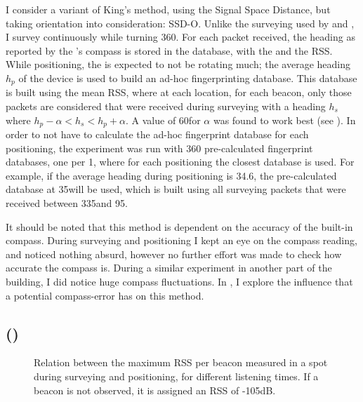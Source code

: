 I consider a variant of King's method, using the Signal Space Distance, but taking orientation into consideration: SSD-O.
Unlike the \wifi surveying used by \citet{bahl2000radar} and \citet{king2006compass}, I survey continuously while turning 360\tdegree.
For each packet received, the heading as reported by the \device's compass is stored in the database, with the \bid and the RSS.
While positioning, the \device is expected to not be rotating much; the average heading $h_p$ of the device is used to build an ad-hoc fingerprinting database.
This database is built using the mean RSS, where at each location, for each beacon, only those packets are considered that were received during surveying with a heading $h_s$ where $h_p - \alpha < h_s < h_p + \alpha$.
A value of 60\tdegree for $\alpha$ was found to work best (see ).
In order to not have to calculate the ad-hoc fingerprint database for each positioning, the experiment was run with 360 pre-calculated fingerprint databases, one per 1\tdegree, where for each positioning the closest database is used.
For example, if the average heading during positioning is 34.6\tdegree, the pre-calculated database at 35\tdegree will be used, which is built using all surveying packets that were received between 335\tdegree and 95\tdegree.

It should be noted that this method is dependent on the accuracy of the built-in compass.
During surveying and positioning I kept an eye on the compass reading, and noticed nothing absurd, however no further effort was made to check how accurate the compass is.
During a similar experiment in another part of the building, I did notice huge compass fluctuations.
In , I explore the influence that a potential compass-error has on this method.

\subsection{\BRP (\aBRP)}
\label{sec:architecture-brp}
\begin{figure}[p]
    \begin{subfigure}[b]{0.5\textwidth}
    \end{subfigure}
    \begin{subfigure}[b]{0.5\textwidth}
    \end{subfigure}
    \begin{subfigure}[b]{0.5\textwidth}
    \end{subfigure}
    \begin{subfigure}[b]{0.5\textwidth}
    \end{subfigure}
    \caption{Relation between the maximum RSS per beacon measured in a spot during surveying and positioning, for different listening times. If a beacon is not observed, it is assigned an RSS of -105dB.}
    \label{fig:architecture-rss-cloud}
\end{figure}

